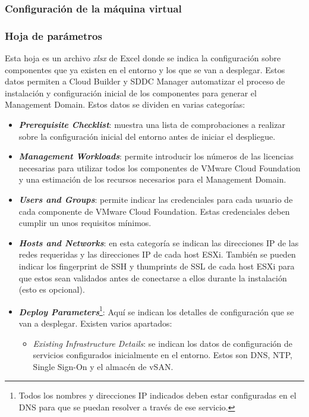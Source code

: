 \subsubsection{Configuración de la máquina virtual}

\subsubsection{Hoja de parámetros}
Esta hoja es un archivo \textit{xlsx} de Excel donde se indica la configuración sobre componentes que ya existen en el entorno y los que se van a desplegar. Estos datos permiten a Cloud Builder y SDDC Manager automatizar el proceso de instalación y configuración inicial de los componentes para generar el Management Domain. Estos datos se dividen en varias categorías:
\begin{itemize}
    \item \textbf{\textit{Prerequisite Checklist}}: muestra una lista de comprobaciones a realizar sobre la configuración inicial del entorno antes de iniciar el despliegue.
    \item \textbf{\textit{Management Workloads}}: permite introducir los números de las licencias necesarias para utilizar todos los componentes de VMware Cloud Foundation y una estimación de los recursos necesarios para el Management Domain.
    \item \textbf{\textit{Users and Groups}}: permite indicar las credenciales para cada usuario de cada componente de VMware Cloud Foundation. Estas credenciales deben cumplir un unos requisitos mínimos.
    \item \textbf{\textit{Hosts and Networks}}: en esta categoría se indican las direcciones IP de las redes requeridas y las direcciones IP de cada host ESXi. También se pueden indicar los fingerprint de SSH y thumprints de SSL de cada host ESXi para que estos sean validados antes de conectarse a ellos durante la instalación (esto es opcional).
    \item \textbf{\textit{Deploy Parameters}}\footnote{Todos los nombres y direcciones IP indicados deben estar configuradas en el DNS para que se puedan resolver a través de ese servicio.}: Aquí se indican los detalles de configuración que se van a desplegar. Existen varios apartados\cite{deploysheet}:
        \begin{itemize}
            \item \emph{Existing Infrastructure Details}: se indican los datos de configuración de servicios configurados inicialmente en el entorno. Estos son DNS, NTP, Single Sign-On y el almacén de vSAN.
            

\end{itemize}
\end{itemize}
